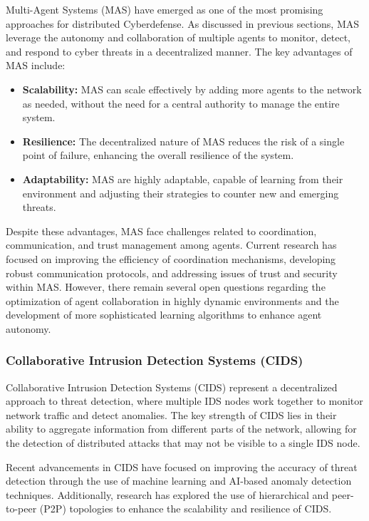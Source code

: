 Multi-Agent Systems (MAS) have emerged as one of the most promising approaches for distributed Cyberdefense. As discussed in previous sections, MAS leverage the autonomy and collaboration of multiple agents to monitor, detect, and respond to cyber threats in a decentralized manner. The key advantages of MAS include:

\begin{itemize}
    \item \textbf{Scalability:} MAS can scale effectively by adding more agents to the network as needed, without the need for a central authority to manage the entire system.
    \item \textbf{Resilience:} The decentralized nature of MAS reduces the risk of a single point of failure, enhancing the overall resilience of the system.
    \item \textbf{Adaptability:} MAS are highly adaptable, capable of learning from their environment and adjusting their strategies to counter new and emerging threats.
\end{itemize}

Despite these advantages, MAS face challenges related to coordination, communication, and trust management among agents. Current research has focused on improving the efficiency of coordination mechanisms, developing robust communication protocols, and addressing issues of trust and security within MAS. However, there remain several open questions regarding the optimization of agent collaboration in highly dynamic environments and the development of more sophisticated learning algorithms to enhance agent autonomy.

\subsubsection{Collaborative Intrusion Detection Systems (CIDS)}

Collaborative Intrusion Detection Systems (CIDS) represent a decentralized approach to threat detection, where multiple IDS nodes work together to monitor network traffic and detect anomalies. The key strength of CIDS lies in their ability to aggregate information from different parts of the network, allowing for the detection of distributed attacks that may not be visible to a single IDS node.

Recent advancements in CIDS have focused on improving the accuracy of threat detection through the use of machine learning and AI-based anomaly detection techniques. Additionally, research has explored the use of hierarchical and peer-to-peer (P2P) topologies to enhance the scalability and resilience of CIDS.


